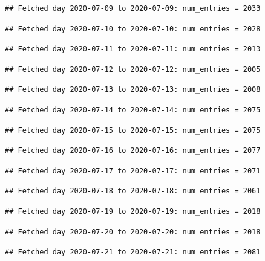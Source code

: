 \documentclass[]{article}
\begin{document}
\begin{verbatim}
## Fetched day 2020-07-09 to 2020-07-09: num_entries = 2033
\end{verbatim}

\begin{verbatim}
## Fetched day 2020-07-10 to 2020-07-10: num_entries = 2028
\end{verbatim}

\begin{verbatim}
## Fetched day 2020-07-11 to 2020-07-11: num_entries = 2013
\end{verbatim}

\begin{verbatim}
## Fetched day 2020-07-12 to 2020-07-12: num_entries = 2005
\end{verbatim}

\begin{verbatim}
## Fetched day 2020-07-13 to 2020-07-13: num_entries = 2008
\end{verbatim}

\begin{verbatim}
## Fetched day 2020-07-14 to 2020-07-14: num_entries = 2075
\end{verbatim}

\begin{verbatim}
## Fetched day 2020-07-15 to 2020-07-15: num_entries = 2075
\end{verbatim}

\begin{verbatim}
## Fetched day 2020-07-16 to 2020-07-16: num_entries = 2077
\end{verbatim}

\begin{verbatim}
## Fetched day 2020-07-17 to 2020-07-17: num_entries = 2071
\end{verbatim}

\begin{verbatim}
## Fetched day 2020-07-18 to 2020-07-18: num_entries = 2061
\end{verbatim}

\begin{verbatim}
## Fetched day 2020-07-19 to 2020-07-19: num_entries = 2018
\end{verbatim}

\begin{verbatim}
## Fetched day 2020-07-20 to 2020-07-20: num_entries = 2018
\end{verbatim}

\begin{verbatim}
## Fetched day 2020-07-21 to 2020-07-21: num_entries = 2081
\end{verbatim}
\end{document}
